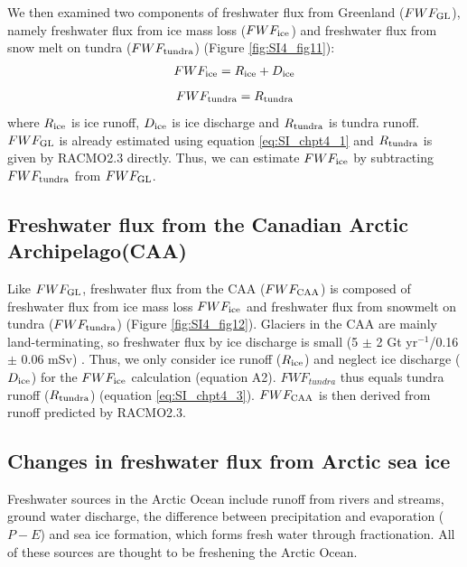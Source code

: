 We then examined two components of freshwater flux from Greenland ($FWF_{\textup{GL}}$), namely freshwater flux from ice mass loss ($FWF_{\textup{ice}}$) and freshwater flux from snow melt on tundra ($FWF_{\textup{tundra}}$) (Figure \ref{fig:SI4_fig11}): 
\begin{equation} \label{eq:SI_chpt4_2}
\begin{aligned}
FWF_{\textup{ice}}=R_{\textup{ice}}+D_{\textup{ice}}
\end{aligned}
\end{equation}
\begin{equation} \label{eq:SI_chpt4_3}
\begin{aligned}
FWF_{\textup{tundra}}=R_{\textup{tundra}}
\end{aligned}
\end{equation}
where $R_{\textup{ice}}$ is ice runoff, $D_{\textup{ice}}$ is ice discharge and $R_{\textup{tundra}}$ is tundra runoff. 
$FWF_{\textup{GL}}$ is already estimated using equation \ref{eq:SI_chpt4_1} and $R_{\textup{tundra}}$ is given by RACMO2.3 directly.  Thus, we can estimate $FWF_{\textup{ice}}$ by subtracting $FWF_{\textup{tundra}}$ from $FWF_{\textup{GL}}$.

\subsection*{Freshwater flux from the Canadian Arctic Archipelago(CAA)}
Like $FWF_{\textup{GL}}$, freshwater flux from the CAA ($FWF_{\textup{CAA}}$) is composed of freshwater flux from ice mass loss $FWF_{\textup{ice}}$ and freshwater flux from snowmelt on tundra ($FWF_{\textup{tundra}}$) (Figure \ref{fig:SI4_fig12}).  Glaciers in the CAA are mainly land-terminating, so freshwater flux by ice discharge is small (5 $\pm$ 2 Gt yr$^{-1}$/0.16 $\pm$ 0.06 mSv) \cite[]{gardner2011sharply}. Thus, we only consider ice runoff ($R_{\textup{ice}}$) and neglect ice discharge ($D_{\textup{ice}}$) for the $FWF_{\textup{ice}}$ calculation (equation A2).  $FWF_{tundra}$ thus equals tundra runoff ($R_{\textup{tundra}}$) (equation \ref{eq:SI_chpt4_3}).  $FWF_{\textup{CAA}}$ is then derived from runoff predicted by RACMO2.3. 
  
\subsection*{Changes in  freshwater flux from Arctic sea ice}
Freshwater sources in the Arctic Ocean include runoff from rivers and streams, ground water discharge, the difference between precipitation and evaporation ($P-E$) and sea ice formation, which forms fresh water through fractionation. All of these sources are thought to be freshening the Arctic Ocean\cite[]{haine2015arctic}.

